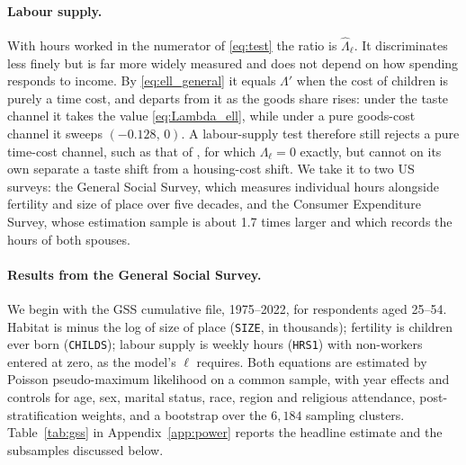 \documentclass[11pt]{article}
\begin{document}
\paragraph{Labour supply.}
With hours worked in the numerator of \eqref{eq:test} the ratio is $\widehat\Lambda_\ell$. It
discriminates less finely but is far more widely measured and does not depend on how spending
responds to income. By \eqref{eq:ell_general} it equals $\Lambda'$ when the cost of
children is purely a time cost, and departs from it as the goods share rises: under the taste
channel it takes the value \eqref{eq:Lambda_ell}, while under a pure goods-cost channel it sweeps
$(-0.128,\,0)$. A labour-supply test therefore still rejects a pure time-cost channel, such as
that of \citet{dao25}, for which $\Lambda_\ell=0$ exactly, but cannot on its
own separate a taste shift from a housing-cost shift. We take it to two US surveys: the General Social Survey, which measures individual hours alongside
fertility and size of place over five decades, and the Consumer Expenditure Survey, whose
estimation sample is about 1.7 times larger and which records the hours of both spouses.

\paragraph{Results from the General Social Survey.}
We begin with the GSS cumulative file, 1975--2022, for respondents aged
25--54. Habitat is minus the log of size of place (\texttt{SIZE}, in thousands); fertility is
children ever born (\texttt{CHILDS}); labour supply is weekly hours (\texttt{HRS1}) with
non-workers entered at zero, as the model's $\ell$ requires. Both equations are estimated by
Poisson pseudo-maximum likelihood on a common sample, with year effects and controls for age, sex,
marital status, race, region and religious attendance, post-stratification weights, and a
bootstrap over the $6{,}184$ sampling clusters. Table~\ref{tab:gss} in Appendix~\ref{app:power}
reports the headline estimate and the subsamples discussed below.
\end{document}

